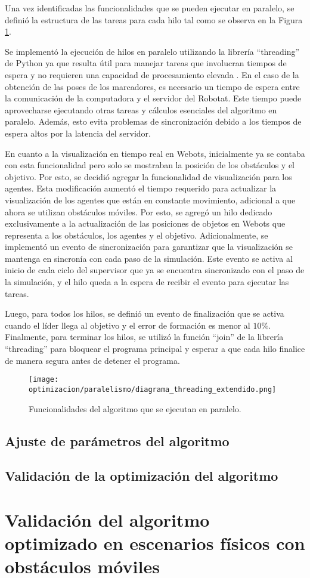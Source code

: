 Una vez identificadas las funcionalidades que se pueden ejecutar en paralelo, se definió la estructura de las tareas para cada hilo tal como se observa en la Figura \ref{fig:diagrama_hilos}. 

Se implementó la ejecución de hilos en paralelo utilizando la librería ``threading'' de Python ya que resulta útil para manejar tareas que involucran tiempos de espera y no requieren una capacidad de procesamiento elevada \cite{PythonThreading}. En el caso de la obtención de las poses de los marcadores, es necesario un tiempo de espera entre la comunicación de la computadora y el servidor del Robotat. Este tiempo puede aprovecharse ejecutando otras tareas y cálculos esenciales del algoritmo en paralelo. Además, esto evita problemas de sincronización debido a los tiempos de espera altos por la latencia del servidor.

En cuanto a la visualización en tiempo real en Webots, inicialmente ya se contaba con esta funcionalidad pero solo se mostraban la posición de los obstáculos y el objetivo. Por esto, se decidió agregar la funcionalidad de visualización para los agentes. Esta modificación aumentó el tiempo requerido para actualizar la visualización de los agentes que están en constante movimiento, adicional a que ahora se utilizan obstáculos móviles. Por esto, se agregó un hilo dedicado exclusivamente a la actualización de las posiciones de objetos en Webots que representa a los obstáculos, los agentes y el objetivo. Adicionalmente, se implementó un evento de sincronización para garantizar que la visualización se mantenga en sincronía con cada paso de la simulación. Este evento se activa al inicio de cada ciclo del supervisor que ya se encuentra sincronizado con el paso de la simulación, y el hilo queda a la espera de recibir el evento para ejecutar las tareas.

Luego, para todos los hilos, se definió un evento de finalización que se activa cuando el líder llega al objetivo y el error de formación es menor al $10\%$. Finalmente, para terminar los hilos, se utilizó la función ``join'' de la librería ``threading'' para bloquear el programa principal y esperar a que cada hilo finalice de manera segura antes de detener el programa.


\begin{figure}[H]
	\centering
	\texttt{[image: optimizacion/paralelismo/diagrama\_threading\_extendido.png]}
	\caption{Funcionalidades del algoritmo que se ejecutan en paralelo.}
	\label{fig:diagrama_hilos}
\end{figure}

\section{Ajuste de parámetros del algoritmo}

\section{Validación de la optimización del algoritmo}

\chapter{Validación del algoritmo optimizado en escenarios físicos con obstáculos móviles}\label{cap:validacion}






